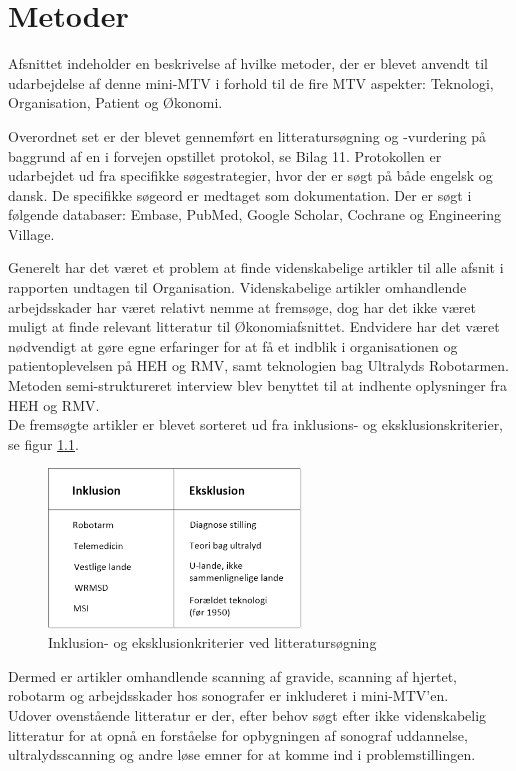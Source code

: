 \chapter{Metoder}
Afsnittet indeholder en beskrivelse af hvilke metoder, der er blevet anvendt til udarbejdelse af denne mini-MTV i forhold til de fire MTV aspekter: Teknologi, Organisation, Patient og Økonomi.

Overordnet set er der blevet gennemført en litteratursøgning og -vurdering på baggrund af en i forvejen opstillet protokol, se Bilag 11. Protokollen er udarbejdet ud fra specifikke søgestrategier, hvor der er søgt på både engelsk og dansk. De specifikke søgeord er medtaget som dokumentation. Der er søgt i følgende databaser: Embase, PubMed, Google Scholar, Cochrane og Engineering Village. 

Generelt har det været et problem at finde videnskabelige artikler til alle afsnit i rapporten undtagen til Organisation. Videnskabelige artikler omhandlende arbejdsskader har været relativt nemme at fremsøge, dog har det ikke været muligt at finde relevant litteratur til Økonomiafsnittet. Endvidere har det været nødvendigt at gøre egne erfaringer for at få et indblik i organisationen og patientoplevelsen på HEH og RMV, samt teknologien bag Ultralyds Robotarmen. Metoden semi-struktureret interview blev benyttet til at indhente oplysninger fra HEH og RMV. \\ 
De fremsøgte artikler er blevet sorteret ud fra inklusions- og eksklusionskriterier, se figur \ref{InklusionEksklusion}. 

\begin{figure}[H]\centering
	\includegraphics[width = 0.6\textwidth]{Figurer/InklusionEksklusion}
	\caption{Inklusion- og eksklusionkriterier ved litteratursøgning}
	\label{InklusionEksklusion}
\end{figure}

Dermed er artikler omhandlende scanning af gravide, scanning af hjertet, robotarm og arbejdsskader hos sonografer er inkluderet i mini-MTV'en.\\
Udover ovenstående litteratur er der, efter behov søgt efter ikke videnskabelig litteratur for at opnå en forståelse for opbygningen af sonograf uddannelse, ultralydsscanning og andre løse emner for at komme ind i problemstillingen. 

